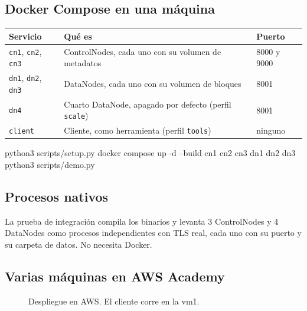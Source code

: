 \documentclass[10pt]{article}
\begin{document}
\subsection{Docker Compose en una máquina}

\begin{xltabular}{\linewidth}{@{}L{3.4cm}YL{3.2cm}@{}}
\toprule
Servicio & Qué es & Puerto \\
\midrule\endhead
\texttt{cn1}, \texttt{cn2}, \texttt{cn3} & ControlNodes, cada uno con su volumen de metadatos & 8000 y 9000 \\
\texttt{dn1}, \texttt{dn2}, \texttt{dn3} & DataNodes, cada uno con su volumen de bloques & 8001 \\
\texttt{dn4} & Cuarto DataNode, apagado por defecto (perfil \texttt{scale}) & 8001 \\
\texttt{client} & Cliente, como herramienta (perfil \texttt{tools}) & ninguno \\
\bottomrule
\end{xltabular}

\begin{codigo}
python3 scripts/setup.py
docker compose up -d --build cn1 cn2 cn3 dn1 dn2 dn3
python3 scripts/demo.py
\end{codigo}

\subsection{Procesos nativos}

La prueba de integración compila los binarios y levanta 3 ControlNodes y 4 DataNodes como procesos independientes con TLS real, cada uno con su puerto y su carpeta de datos. No necesita Docker.

\subsection{Varias máquinas en AWS Academy}

\begin{figure}[htbp]
\centering
{}
\caption{Despliegue en AWS. El cliente corre en la vm1.}
\end{figure}
\end{document}
